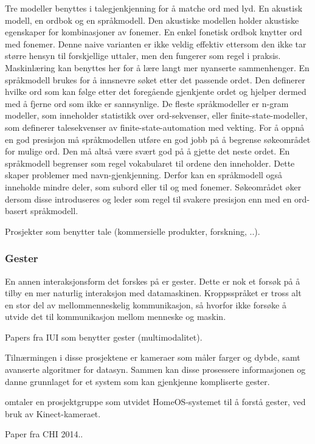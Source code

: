 {{Tre modeller benyttes i talegjenkjenning for å matche ord med lyd. En akustisk modell, en ordbok og en språkmodell. Den akustiske modellen holder akustiske egenskaper for kombinasjoner av fonemer. En enkel fonetisk ordbok knytter ord med fonemer. Denne naive varianten er ikke veldig effektiv ettersom den ikke tar større hensyn til forskjellige uttaler, men den fungerer som regel i praksis. Maskinlæring kan benyttes her for å lære langt mer nyanserte sammenhenger. En språkmodell brukes for å innsnevre søket etter det passende ordet. Den definerer hvilke ord som kan følge etter det foregående gjenkjente ordet og hjelper dermed med å fjerne ord som ikke er sannsynlige. De fleste språkmodeller er n-gram modeller, som inneholder statistikk over ord-sekvenser, eller finite-state-modeller, som definerer talesekvenser av finite-state-automation med vekting. For å oppnå en god presisjon må språkmodellen utføre en god jobb på å begrense søkeområdet for mulige ord. Den må altså være svært god på å gjette det neste ordet. En språkmodell begrenser som regel vokabularet til ordene den inneholder. Dette skaper problemer med navn-gjenkjenning. Derfor kan en språkmodell også inneholde mindre deler, som subord eller til og med fonemer. Søkeområdet øker dersom disse introduseres og leder som regel til svakere presisjon enn med en ord-basert språkmodell.  

Prosjekter som benytter tale (kommersielle produkter, forskning, ..).
}

\subsubsection*{Gester}
{\color{blue}
En annen interaksjonsform det forskes på er gester. Dette er nok et forsøk på å tilby en mer naturlig interaksjon med datamaskinen. Kroppsspråket er tross alt en stor del av mellommenneskelig kommunikasjon, så hvorfor ikke forsøke å utvide det til kommunikasjon mellom menneske og maskin.

Papers fra IUI som benytter gester (multimodalitet).

Tilnærmingen i disse prosjektene er kameraer som måler farger og dybde, samt avanserte algoritmer for datasyn. Sammen kan disse prosessere informasjonen og danne grunnlaget for et system som kan gjenkjenne kompliserte gester.

\citet{homeos} omtaler en prosjektgruppe som utvidet HomeOS-systemet til å forstå gester, ved bruk av Kinect-kameraet.

Paper fra CHI 2014..
}

}
